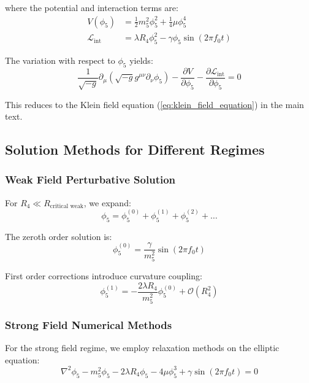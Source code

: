 \documentclass[12pt]{iopart}
\begin{document}
where the potential and interaction terms are:
\begin{align}
V(\phi_5) &= \frac{1}{2}m_5^2\phi_5^2 + \frac{1}{4}\mu\phi_5^4\\
\mathcal{L}_{\text{int}} &= \lambda R_4\phi_5^2 - \gamma\phi_5\sin(2\pi f_0 t)
\end{align}

The variation with respect to $\phi_5$ yields:
\begin{equation}
\frac{1}{\sqrt{-g}}\partial_\mu(\sqrt{-g}g^{\mu\nu}\partial_\nu\phi_5) - \frac{\partial V}{\partial\phi_5} - \frac{\partial\mathcal{L}_{\text{int}}}{\partial\phi_5} = 0
\end{equation}

This reduces to the Klein field equation (\ref{eq:klein_field_equation}) in the main text.

\subsection{Solution Methods for Different Regimes}

\subsubsection{Weak Field Perturbative Solution}

For $R_4 \ll R_{\text{critical weak}}$, we expand:
\begin{equation}
\phi_5 = \phi_5^{(0)} + \phi_5^{(1)} + \phi_5^{(2)} + \ldots
\end{equation}

The zeroth order solution is:
\begin{equation}
\phi_5^{(0)} = \frac{\gamma}{m_5^2}\sin(2\pi f_0 t)
\end{equation}

First order corrections introduce curvature coupling:
\begin{equation}
\phi_5^{(1)} = -\frac{2\lambda R_4}{m_5^2}\phi_5^{(0)} + \mathcal{O}(R_4^2)
\end{equation}

\subsubsection{Strong Field Numerical Methods}

For the strong field regime, we employ relaxation methods on the elliptic equation:
\begin{equation}
\nabla^2\phi_5 - m_5^2\phi_5 - 2\lambda R_4\phi_5 - 4\mu\phi_5^3 + \gamma\sin(2\pi f_0 t) = 0
\end{equation}
\end{document}
